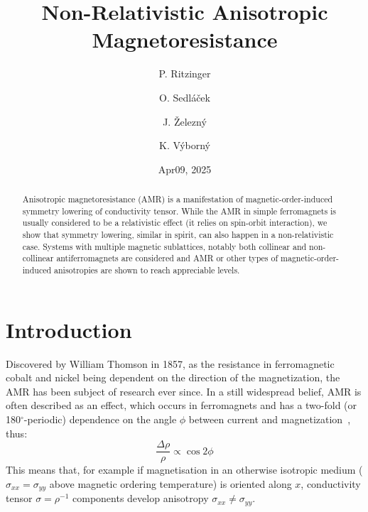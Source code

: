 \documentclass[prb,showpacs,amsmath,amssymb,superscriptaddress,twocolumn,floatfix]{revtex4-1}
\begin{document}
\title{Non-Relativistic Anisotropic Magnetoresistance}

\author{P. Ritzinger}

\author{O. Sedl\'a\v cek}
\author{J. \v Zelezn\'y}

\author{K. V\'yborn\'y}


\date{Apr09, 2025}

\begin{abstract}
Anisotropic magnetoresistance (AMR) is a manifestation of
magnetic-order-induced symmetry lowering of conductivity tensor.
While the AMR in simple ferromagnets is usually considered to be a
relativistic effect (it relies on spin-orbit interaction), we show
that symmetry lowering, similar in spirit, can also happen in a
non-relativistic case. Systems with multiple magnetic sublattices,
notably both collinear and non-collinear antiferromagnets are considered
and AMR or other types of magnetic-order-induced anisotropies are shown
to reach appreciable levels.
\end{abstract}


\maketitle

\section{Introduction}

Discovered by William Thomson in 1857,\cite{Thomson:1857} as the
resistance in ferromagnetic cobalt and nickel being dependent on the
direction of the magnetization, the AMR has been subject of research
ever since.\cite{Ritzinger:2023} In a still widespread belief, AMR is
often described as an effect, which occurs in ferromagnets and has a
two-fold (or 180$^\circ$-periodic) dependence on the angle $\phi$ between current and magnetization~\cite{Alagoz:2015}, thus:
%
\begin{equation}
	\frac{\Delta \rho}{\rho} \propto \cos 2 \phi
	\label{eq_ncollAMR}
\end{equation}
%
This means that, for example if magnetisation in an otherwise
isotropic medium ($\sigma_{xx}=\sigma_{yy}$ above magnetic ordering
temperature) is oriented along $x$, conductivity tensor
$\sigma=\rho^{-1}$ components develop anisotropy $\sigma_{xx}\not=\sigma_{yy}$.
\end{document}

